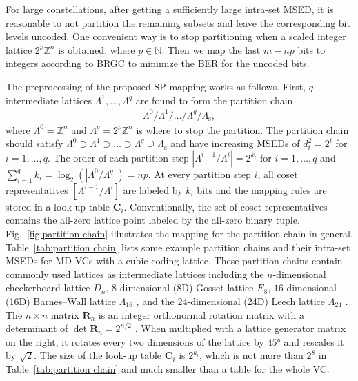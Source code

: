 \documentclass[journal]{IEEEtran}
\newcommand{\Z}{\mathbb{Z}}
\newcommand{\bC}{\boldsymbol{C}}
\newcommand{\bR}{\boldsymbol{R}}
\newcommand{\Lambdas}{\Lambda_\mathrm{s}}
\begin{document}
For large constellations, after getting a sufficiently large intra-set MSED, it is reasonable to not partition the remaining subsets and leave the corresponding bit levels uncoded. One convenient way is to stop partitioning when a scaled integer lattice $2^p\Z^n$ is obtained, where $p\in \mathbb{N}$. Then we map the last $m-np$ bits to integers according to BRGC to minimize the BER for the uncoded bits.

The preprocessing of the proposed SP mapping works as follows. First, $q$ intermediate lattices $\Lambda^1, \dots, \Lambda^{q}$ are found to form the partition chain
\begin{align} \Lambda^0/\Lambda^1/\dots/\Lambda^{q}/\Lambdas,
\end{align}
where $\Lambda^0=\Z^n$ and $\Lambda^q=2^p\Z^n$ is where to stop the partition. The partition chain should satisfy $\Lambda^0 \supset \Lambda^1 \supset \dots \supset \Lambda^q \supseteq \Lambdas$ and have increasing MSEDs of $d_i^2=2^i$ for ${i=1,\ldots,q}$. The order of each partition step $|\Lambda^{i-1}/\Lambda^i|=2^{k_i}$ for $i=1,\ldots,q$ and $\sum_{i=1}^q k_i= \log_2(|\Lambda^0/\Lambda^q|)=np$. At every partition step $i$, all coset representatives $[\Lambda^{i-1}/\Lambda^i]$ are labeled by $k_i$ bits and the mapping rules are stored in a look-up table $\bC_i$. Conventionally, the set of coset representatives contains the all-zero lattice point labeled by the all-zero binary tuple. Fig.~\ref{fig:partition chain} illustrates the mapping for the partition chain in general. Table~\ref{tab:partition chain} lists some example partition chains and their intra-set MSEDs for MD VCs with a cubic coding lattice. These partition chains contain commonly used lattices as intermediate lattices including the $n$-dimensional checkerboard lattice $D_n$, $8$-dimensional (8D) Gosset lattice $E_{8}$, $16$-dimensional (16D) Barnes--Wall lattice $\Lambda_{16}$ \cite{pook23}, and the $24$-dimensional (24D) Leech lattice $\Lambda_{24}$ \cite[Ch.~4]{conway99book}. The $n\times n$ matrix $\bR_n$ is an integer orthonormal rotation matrix with a determinant of $\det\bR_n=2^{n/2}$ \cite{forney89b, forney88}. When multiplied with a lattice generator matrix on the right, it rotates every two dimensions of the lattice by $\ang{45}$ and rescales it by $\sqrt{2}$. The size of the look-up table $\bC_i$ is $2^{k_i}$, which is not more than $2^8$ in Table~\ref{tab:partition chain} and much smaller than a table for the whole VC.
\end{document}
